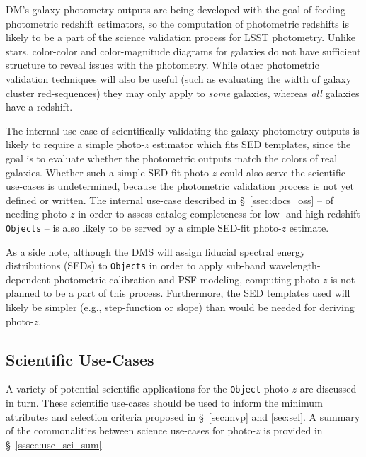 \documentclass[DM,lsstdraft,toc]{lsstdoc}
\begin{document}
DM's galaxy photometry outputs are being developed with the goal of feeding photometric redshift estimators, so the computation of photometric redshifts is likely to be a part of the science validation process for LSST photometry. 
Unlike stars, color-color and color-magnitude diagrams for galaxies do not have sufficient structure to reveal issues with the photometry.
While other photometric validation techniques will also be useful (such as evaluating the width of galaxy cluster red-sequences) they may only apply to {\it some} galaxies, whereas {\it all} galaxies have a redshift. 

The internal use-case of scientifically validating the galaxy photometry outputs is likely to require a simple photo-$z$ estimator which fits SED templates, since the goal is to evaluate whether the photometric outputs match the colors of real galaxies.
Whether such a simple SED-fit photo-$z$ could also serve the scientific use-cases is undetermined, because the photometric validation process is not yet defined or written.
The internal use-case described in \S~\ref{ssec:docs_oss} -- of needing photo-$z$ in order to assess catalog completeness for low- and high-redshift {\tt Objects} -- is also likely to be served by a simple SED-fit photo-$z$ estimate.

As a side note, although the DMS will assign fiducial spectral energy distributions (SEDs) to {\tt Objects} in order to apply sub-band wavelength-dependent photometric calibration and PSF modeling, computing photo-$z$ is not planned to be a part of this process.
Furthermore, the SED templates used will likely be simpler (e.g., step-function or slope) than would be needed for deriving photo-$z$.

\subsection{Scientific Use-Cases}\label{ssec:use_sci}

A variety of potential scientific applications for the {\tt Object} photo-$z$ are discussed in turn. 
These scientific use-cases should be used to inform the minimum attributes and selection criteria proposed in \S~\ref{sec:mvp} and \ref{sec:sel}.
A summary of the commonalities between science use-cases for photo-$z$ is provided in \S~\ref{sssec:use_sci_sum}.
\end{document}
